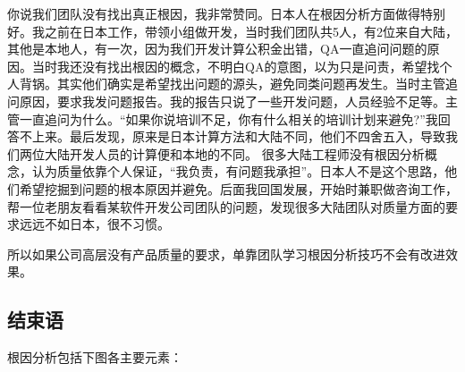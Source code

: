 
你说我们团队没有找出真正根因，我非常赞同。日本人在根因分析方面做得特别好。我之前在日本工作，带领小组做开发，当时我们团队共5人，有2位来自大陆，其他是本地人，有一次，因为我们开发计算公积金出错，QA一直追问问题的原因。当时我还没有找出根因的概念，不明白QA的意图，以为只是问责，希望找个人背锅。其实他们确实是希望找出问题的源头，避免同类问题再发生。当时主管追问原因，要求我发问题报告。我的报告只说了一些开发问题，人员经验不足等。主管一直追问为什么。``如果你说培训不足，你有什么相关的培训计划来避免?''我回答不上来。最后发现，原来是日本计算方法和大陆不同，他们不四舍五入，导致我们两位大陆开发人员的计算便和本地的不同。
很多大陆工程师没有根因分析概念，认为质量依靠个人保证，``我负责，有问题我承担''。日本人不是这个思路，他们希望挖掘到问题的根本原因并避免。后面我回国发展，开始时兼职做咨询工作，帮一位老朋友看看某软件开发公司团队的问题，发现很多大陆团队对质量方面的要求远远不如日本，很不习惯。


所以如果公司高层没有产品质量的要求，单靠团队学习根因分析技巧不会有改进效果。

\hypertarget{ux7ed3ux675fux8bed}{%
\subsection{结束语}\label{ux7ed3ux675fux8bed}}

根因分析包括下图各主要元素：

